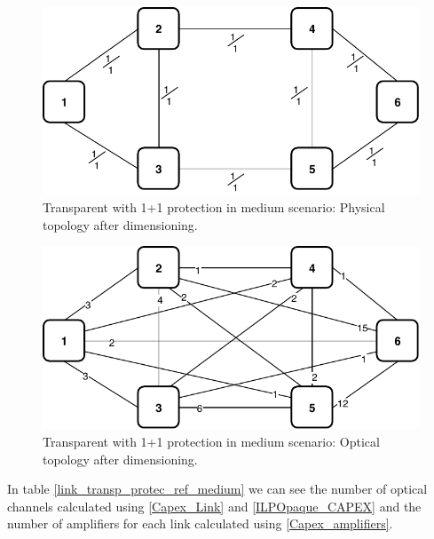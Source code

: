 \begin{figure}[h!]
\centering
\includegraphics[width=13cm]{sdf/ilp/transparent_protection/figures/physical_topology}
\caption{Transparent with 1+1 protection in medium scenario: Physical topology after dimensioning.}
\label{physical2_protectionmedium}
\end{figure}

\newpage
\begin{figure}[h!]
\centering
\includegraphics[width=13cm]{sdf/ilp/transparent_protection/figures/optical_topology_medium}
\caption{Transparent with 1+1 protection in medium scenario: Optical topology after dimensioning.}
\label{optical2_protectionmedium}
\end{figure}

\vspace{15pt}
In table \ref{link_transp_protec_ref_medium} we can see the number of optical channels calculated using \ref{Capex_Link} and \ref{ILPOpaque_CAPEX} and the number of amplifiers for each link calculated using \ref{Capex_amplifiers}.\\

